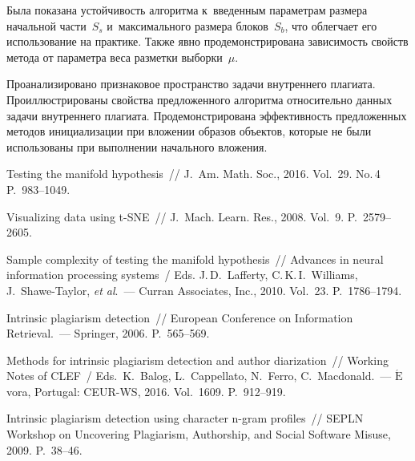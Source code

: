 \begin{multicols}{2}
Была показана устойчивость алгоритма к~введенным параметрам размера 
начальной части~$S_s$ и~максимального размера блоков~$S_b$, что облегчает его
 использование на практике. Также явно продемонстрирована зависимость свойств 
 метода от параметра веса разметки выборки~$\mu$.

Проанализировано признаковое пространство задачи внутреннего плагиата. 
Проиллюстрированы свойства предложенного алгоритма относительно данных задачи 
внутреннего плагиата. Продемонстрирована эффективность предложенных методов 
инициализации при вложении образов объектов, которые не были использованы 
при выполнении начального вложения.

\vspace*{-8pt}

{\small\frenchspacing
 {%
 \begin{thebibliography}{99}
 
 \vspace*{-2pt}
 
Testing the manifold hypothesis~// J.~Am. Math. Soc., 2016. Vol.~29. No.\,4 
P.~983--1049.

Visualizing data using \mbox{t-SNE}~// J.~Mach. Learn. Res., 2008. Vol.~9. 
P.~2579--2605.

Sample complexity of testing the manifold hypothesis~// Advances in neural 
information 
processing systems~/ Eds. J.\,D.~Lafferty, C.\,K.\,I.~Williams, J.~Shawe-Taylor, \textit{et al}.~---
Curran Associates, Inc., 2010. Vol.~23. P.~1786--1794.

 Intrinsic plagiarism detection~// European Conference on Information Retrieval.~--- 
Springer,  2006. P.~565--569.

 Methods for intrinsic plagiarism detection and author diarization~// 
 Working Notes  of CLEF~/ Eds.\ K.~Balog, L.~Cappellato, N.~Ferro, C.~Macdonald.~---
 $\acute{\mbox{E}}$vora, Portugal:
 CEUR-WS, 2016. Vol.~1609. P.~912--919.
 
 Intrinsic plagiarism detection using character n-gram profiles~// 
SEPLN Workshop on Uncovering Plagiarism, Authorship, and Social Software Misuse, 
2009. P.~38--46.


\end{thebibliography}}}
\end{multicols}
